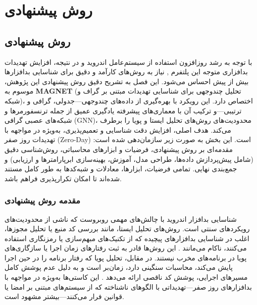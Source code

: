 \clearpage
\thispagestyle{empty}
\chapter{روش پیشنهادی}\label{chap3}

\section{روش پیشنهادی}

با توجه به رشد روزافزون استفاده از سیستم‌عامل اندروید \citep{Statista2024} و در نتیجه، افزایش تهدیدات بدافزاری متوجه این پلتفرم \citep{Faruki2015, AndroidSecurity}, نیاز به روش‌های کارآمد و دقیق برای شناسایی بدافزارها بیش از پیش احساس می‌شود. این فصل به تشریح دقیق روش پیشنهادی این پژوهش، موسوم به \textbf{MAGNET} (تحلیل چندوجهی برای شناسایی تهدیدات مبتنی بر گراف و شبکه)، اختصاص دارد. این رویکرد با بهره‌گیری از داده‌های چندوجهی—جدولی، گرافی و ترتیبی—و ترکیب آن با معماری‌های پیشرفته یادگیری عمیق از جمله ترنسفورمرها و شبکه‌های عصبی گرافی (GNN)، محدودیت‌های روش‌های تحلیل ایستا و پویا را برطرف می‌کند. هدف اصلی، افزایش دقت شناسایی و تعمیم‌پذیری، به‌ویژه در مواجهه با تهدیدات روز صفر (Zero-Day) است. این بخش به صورت زیر سازمان‌دهی شده است: مقدمه‌ای بر روش پیشنهادی، فرضیات و ابزارهای محاسباتی، روش‌شناسی دقیق (شامل پیش‌پردازش داده‌ها، طراحی مدل، آموزش، بهینه‌سازی ابرپارامترها و ارزیابی) و جمع‌بندی نهایی. تمامی فرضیات، ابزارها، معادلات و شبه‌کدها به طور کامل مستند شده‌اند تا امکان تکرارپذیری فراهم باشد.

\subsection{مقدمه روش پیشنهادی}

شناسایی بدافزار اندروید با چالش‌های مهمی روبروست که ناشی از محدودیت‌های رویکردهای سنتی است. روش‌های تحلیل ایستا، مانند بررسی کد منبع یا تحلیل مجوزها، اغلب در شناسایی بدافزارهای پیچیده که از تکنیک‌های مبهم‌سازی یا رمزنگاری استفاده می‌کنند، ناکام می‌مانند \cite{Drebin}. این روش‌ها قادر به ثبت رفتارهای زمان اجرا یا سازگاری‌های پویا در برنامه‌های مخرب نیستند. در مقابل، تحلیل پویا که رفتار برنامه را در حین اجرا پایش می‌کند، محاسبات سنگینی دارد، زمان‌بر است و به دلیل عدم پوشش کامل مسیرهای اجرایی، پوشش کد ناقصی ارائه می‌دهد \cite{spreitzenbarth2013mobile}. این کاستی‌ها به‌ویژه در مواجهه با بدافزارهای روز صفر—تهدیداتی با الگوهای ناشناخته که از سیستم‌های مبتنی بر امضا یا قوانین فرار می‌کنند—بیشتر مشهود است.

